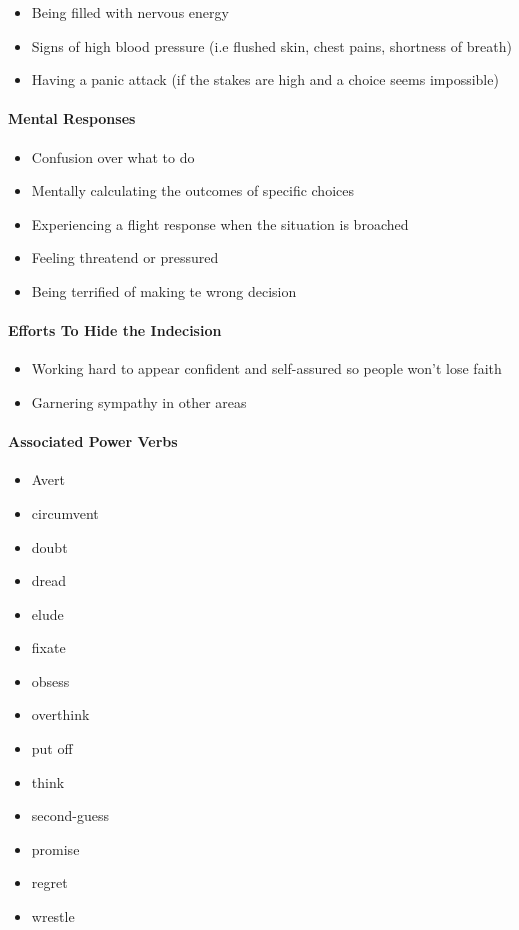\begin{itemize}
    \item Being filled with nervous energy
    \item Signs of high blood pressure (i.e flushed skin, chest pains, shortness of breath)
    \item Having a panic attack (if the stakes are high and a choice seems impossible)
\end{itemize}

\paragraph{Mental Responses}

\begin{itemize}
    \item Confusion over what to do
    \item Mentally calculating the outcomes of specific choices
    \item Experiencing a flight response when the situation is broached
    \item Feeling threatend or pressured
    \item Being terrified of making te wrong decision
\end{itemize}

\paragraph{Efforts To Hide the Indecision}

\begin{itemize}
    \item Working hard to appear confident and self-assured so people won't lose faith
    \item Garnering sympathy in other areas
\end{itemize}


\paragraph{Associated Power Verbs}

\begin{itemize}
    \item Avert
    \item circumvent
    \item doubt
    \item dread
    \item elude
    \item fixate
    \item obsess
    \item overthink
    \item put off
    \item think
    \item second-guess
    \item promise
    \item regret
    \item wrestle
\end{itemize}

